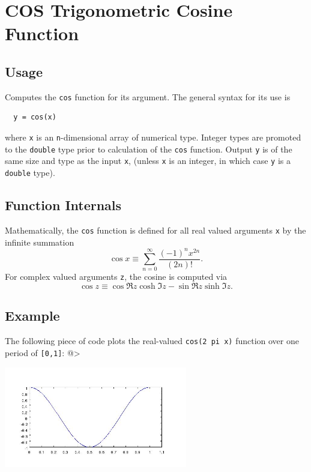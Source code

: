 \section{COS Trigonometric Cosine Function}

\subsection{Usage}

Computes the \verb|cos| function for its argument.  The general
syntax for its use is
\begin{verbatim}
  y = cos(x)
\end{verbatim}
where \verb|x| is an \verb|n|-dimensional array of numerical type.
Integer types are promoted to the \verb|double| type prior to
calculation of the \verb|cos| function.  Output \verb|y| is of the
same size and type as the input \verb|x|, (unless \verb|x| is an
integer, in which case \verb|y| is a \verb|double| type).  
\subsection{Function Internals}

Mathematically, the \verb|cos| function is defined for all real
valued arguments \verb|x| by the infinite summation
\[
  \cos x \equiv \sum_{n=0}^{\infty} \frac{(-1)^n x^{2n}}{(2n)!}.
\]
For complex valued arguments \verb|z|, the cosine is computed via
\[
  \cos z \equiv \cos \Re z \cosh \Im z - \sin \Re z
  \sinh \Im z.
\]
\subsection{Example}

The following piece of code plots the real-valued \verb|cos(2 pi x)|
function over one period of \verb|[0,1]|:
@>


\centerline{\includegraphics[width=8cm]{cosplot}}

